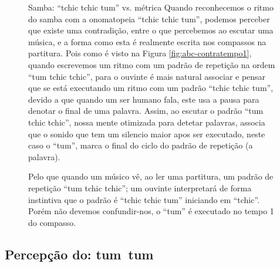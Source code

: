 \begin{figure}[!h]
\begin{elaboracion}{Samba: ``tchic tchic tum'' vs. métrica}
Quando reconhecemos o ritmo do samba com a onomatopeia ``tchic tchic tum'', 
podemos perceber que existe uma contradição, entre 
o que percebemos ao escutar uma música, e a forma como esta é realmente escrita nos compassos na partitura.
Pois como é visto na Figura \ref{fig:abc-contratempo1}, quando escrevemos
um ritmo com um padrão de repetição na ordem ``tum tchic tchic'', 
para o ouvinte é mais natural associar e pensar
que se está executando um ritmo com um padrão ``tchic tchic tum'', 
devido a que quando um ser humano fala, este usa a pausa
para denotar o final de uma palavra. Assim, ao escutar o padrão ``tum tchic tchic'', 
nossa mente otimizada para detetar palavras,
associa que o sonido que tem um silencio maior apos ser executado,
neste caso o ``tum'', marca o final do ciclo do padrão de repetição (a palavra). 

Pelo que quando um músico vê, ao ler uma partitura, 
um padrão de repetição ``tum tchic tchic''; 
um ouvinte interpretará de forma instintiva que o padrão é ``tchic tchic tum'' iniciando em ``tchic''.
Porém não devemos confundir-nos, o ``tum'' é executado no tempo 1 do compasso.
\end{elaboracion}
\label{fig:RitmoVsFala}
\end{figure}

\subsection{Percepção do: tum~tum}

